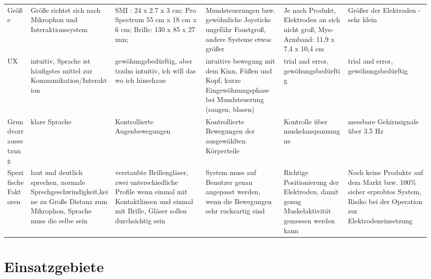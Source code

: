 \begin{landscape}
\begin{longtable}{|p{3cm}|p{3cm}|p{3cm}|p{3cm}|p{3cm}|p{3cm}|}
Größe                     & Größe richtet sich nach Mikrophon und Interaktionssystem                                                                    & SMI : 24 x 2.7 x 3 cm; Pro Spectrum 55 cm x 18 cm x 6 cm; Brille: 130 x 85 x 27 mm;                                                          & Mundsteuerungen bzw. gewöhnliche Joysticks ungefähr Faustgroß, andere Systeme etwas größer                   & Je nach Produkt, Elektroden an sich nicht groß, Myo-Armband: 11,9 x 7,4 x 10,4 cm        & Größer der Elektroden - sehr klein                                                                                      \\
UX                        & intuitiv, Sprache ist häufigstes mittel zur Kommunikation/Interaktion                                                       & gewöhungsbedürftig, aber trzdm intuitiv, ich will das wo ich hinschaue                                                                       & intuitive bewegung mit dem Kinn, Füßen und Kopf, kurze Eingewöhnungsphase bei Mundsteuerung (saugen, blasen) & trial and error, gewöhungsbedürftig                                                      & trial and error, gewöhungsbedürftig                                                                                     \\
Grundvorraussetzung       & klare Sprache                                                                                                               & Kontrollierte Augenbewegungen                                                                                                                & Kontrollierte Bewegungen der ausgewählten Körperteile                                                        & Kontrolle über muskelanspannungne                                                        & messbare Gehirnsignale über 3.5 Hz                                                                                      \\
Spezifische Faktoren      & laut und deutlich sprechen, normale Sprechgeschwindigkeit,keine zu Große Distanz zum Mikrophon, Sprache muss die selbe sein & verstaubte Brillengläser, zwei unterschiedliche Profile wenn einmal mit Kontaktlinsen und einmal mit Brille, Gläser sollen durchsichtig sein & System muss auf Benutzer genau angepasst werden, wenn die Bewegungen sehr rucksartig sind                    & Richtige Positionierung der Elektroden, damit genug Muskelaktivität gemessen werden kann & Noch keine Produkte auf dem Markt bzw. 100\% sicher erprobtes System, Risiko bei der Operation zur Elektrodeneinsetzung

\end{longtable}
\end{landscape}



\section{Einsatzgebiete}





 



